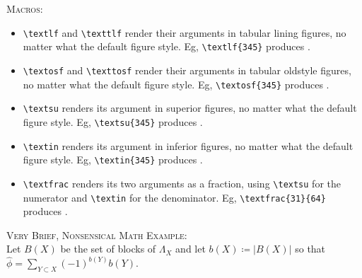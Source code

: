 \documentclass[11pt]{amsart}
\begin{document}
\textsc{Macros:}
\begin{itemize}
\item
\verb|\textlf| and \verb|\texttlf| render their arguments in tabular lining figures, no matter what the default figure style. Eg, \verb|\textlf{345}| produces .
\item
\verb|\textosf| and \verb|\texttosf| render their arguments in tabular oldstyle figures, no matter what the default figure style. Eg, \verb|\textosf{345}| produces .
\item
\verb|\textsu|  renders its argument in superior figures, no matter what the default figure style. Eg, \verb|\textsu{345}| produces .
\item
\verb|\textin|  renders its argument in inferior figures, no matter what the default figure style. Eg, \verb|\textin{345}| produces .
\item
\verb|\textfrac|  renders its two arguments as a fraction, using \verb|\textsu| for the numerator and \verb|\textin| for the denominator. Eg, \verb|\textfrac{31}{64}| produces .
\end{itemize}
\textsc{Very Brief, Nonsensical Math Example:}\\
Let $B(X)$ be the set of blocks of $\Lambda_{X}$
and let $b(X) \coloneq |{B(X)}|$ so that $\hat\phi=\sum_{Y\subset X}(-1)^{b(Y)}b(Y)$. 
\end{document}
